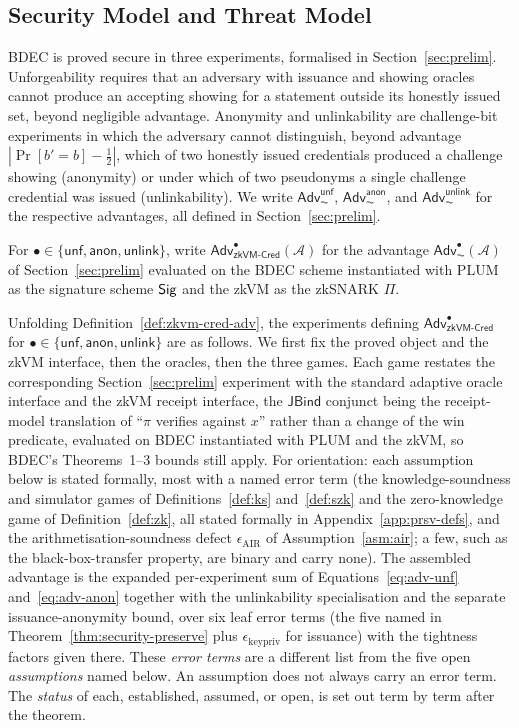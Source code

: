 \subsection{Security Model and Threat Model}\label{ssec:threat-model}
BDEC is proved secure in three experiments, formalised in Section~\ref{sec:prelim}. Unforgeability requires that an adversary with issuance and showing oracles cannot produce an accepting showing for a statement outside its honestly issued set, beyond negligible advantage. Anonymity and unlinkability are challenge-bit experiments in which the adversary cannot distinguish, beyond advantage $|\Pr[b'=b]-\tfrac12|$, which of two honestly issued credentials produced a challenge showing (anonymity) or under which of two pseudonyms a single challenge credential was issued (unlinkability). We write $\mathsf{Adv}^{\mathsf{unf}}_{\AC}$, $\mathsf{Adv}^{\mathsf{anon}}_{\AC}$, and $\mathsf{Adv}^{\mathsf{unlink}}_{\AC}$ for the respective advantages, all defined in Section~\ref{sec:prelim}.
\begin{definition}\label{def:zkvm-cred-adv}
    For $\bullet\in\{\mathsf{unf},\mathsf{anon},\mathsf{unlink}\}$, write $\mathsf{Adv}^{\bullet}_{\mathsf{zkVM\text{-}Cred}}(\mathcal A)$ for the advantage $\mathsf{Adv}^{\bullet}_{\AC}(\mathcal A)$ of Section~\ref{sec:prelim} evaluated on the BDEC scheme instantiated with PLUM as the signature scheme $\mathsf{Sig}$ and the zkVM as the zkSNARK $\Pi$.
\end{definition}

Unfolding Definition~\ref{def:zkvm-cred-adv}, the experiments defining $\mathsf{Adv}^{\bullet}_{\mathsf{zkVM\text{-}Cred}}$ for $\bullet\in\{\mathsf{unf},\mathsf{anon},\mathsf{unlink}\}$ are as follows. We first fix the proved object and the zkVM interface, then the oracles, then the three games. Each game restates the corresponding Section~\ref{sec:prelim} experiment with the standard adaptive oracle interface and the zkVM receipt interface, the $\mathsf{JBind}$ conjunct being the receipt-model translation of ``$\pi$ verifies against $x$'' rather than a change of the win predicate, evaluated on BDEC instantiated with PLUM and the zkVM, so BDEC's Theorems~1--3 bounds still apply. For orientation: each assumption below is stated formally, most with a named error term (the knowledge-soundness and simulator games of Definitions~\ref{def:ks} and~\ref{def:szk} and the zero-knowledge game of Definition~\ref{def:zk}, all stated formally in Appendix~\ref{app:prsv-defs}, and the arithmetisation-soundness defect $\epsilon_{\mathrm{AIR}}$ of Assumption~\ref{asm:air}; a few, such as the black-box-transfer property, are binary and carry none). The assembled advantage is the expanded per-experiment sum of Equations~\eqref{eq:adv-unf} and~\eqref{eq:adv-anon} together with the unlinkability specialisation and the separate issuance-anonymity bound, over six leaf error terms (the five named in Theorem~\ref{thm:security-preserve} plus $\epsilon_{\mathrm{keypriv}}$ for issuance) with the tightness factors given there. These \emph{error terms} are a different list from the five open \emph{assumptions} named below. An assumption does not always carry an error term. The \emph{status} of each, established, assumed, or open, is set out term by term after the theorem.

